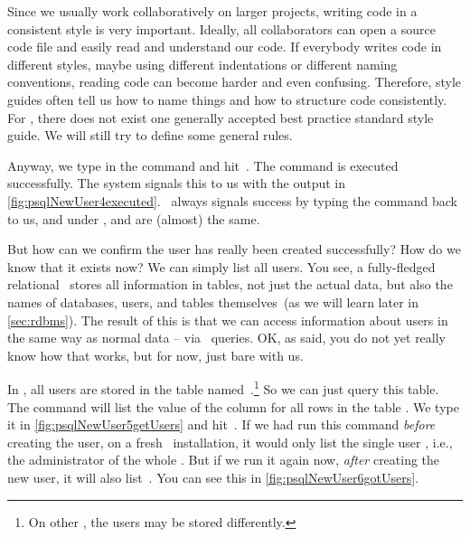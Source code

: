 Since we usually work collaboratively on larger projects, writing code in a consistent style is very important.
Ideally, all collaborators can open a source code file and easily read and understand our code.
If everybody writes code in different styles, maybe using different indentations or different naming conventions, reading code can become harder and even confusing.
Therefore, style guides often tell us how to name things and how to structure code consistently.
For \sql, there does not exist one generally accepted best practice standard style guide.
We will still try to define some general rules.%
%
%

Anyway, we type in the command and hit~\keys{\enter}.
The command is executed successfully.
The system signals this to us with the output  in \cref{fig:psqlNewUser4executed}.
\psql\ always signals success by typing the command back to us, and under \postgresql,  and  are (almost) the same.

But how can we confirm the user  has really been created successfully?
How do we know that it exists now?
We can simply list all users.
You see, a fully-fledged relational \dbms\ stores all information in tables, not just the actual data, but also the names of databases, users, and tables themselves~(as we will learn later in \cref{sec:rdbms}).
The result of this is that we can access information about users in the same way as normal data -- via \sql\ queries.
OK, as said, you do not yet really know how that works, but for now, just bare with us.

In \postgresql, all users are stored in the table named~.\footnote{%
On other , the users may be stored differently.}
So we can just query this table.
The \sql{} command  will list the value of the column  for all rows in the table .
We type it in \cref{fig:psqlNewUser5getUsers} and hit~\keys{\enter}.
If we had run this command \emph{before} creating the user, on a fresh \postgresql\ installation, it would only list the single user , i.e., the administrator of the whole \dbms.
But if we run it again now, \emph{after} creating the new user, it will also list~.
You can see this in \cref{fig:psqlNewUser6gotUsers}.

